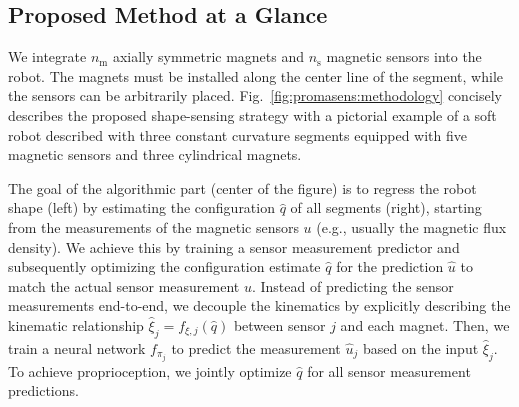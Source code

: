 \subsection{Proposed Method at a Glance}

We integrate $n_\mathrm{m}$ axially symmetric magnets and $n_\mathrm{s}$ magnetic sensors into the robot. The magnets must be installed along the center line of the segment, while the sensors can be arbitrarily placed.
%
%
Fig.~\ref{fig:promasens:methodology} concisely describes the proposed shape-sensing strategy with a pictorial example of a soft robot described with three constant curvature segments equipped with five magnetic sensors and three cylindrical magnets.
%

The goal of the algorithmic part (center of the figure) is to regress the robot shape (left) by estimating the configuration $\hat{q}$ of all segments (right),
starting from the measurements of the magnetic sensors $u$ (e.g., usually the magnetic flux density).
We achieve this by training a sensor measurement predictor and subsequently optimizing the configuration estimate $\hat{q}$ for the prediction $\hat{u}$ to match the actual sensor measurement $u$.
Instead of predicting the sensor measurements end-to-end, we decouple the kinematics by explicitly describing the kinematic relationship $\hat{\xi}_j = f_{\xi,j}(\hat{q})$ between sensor $j$ and each magnet. %
Then, we train a neural network $f_{\pi_j}$ to predict the measurement $\hat{u}_j$ based on the input $\hat{\xi}_j$.
To achieve proprioception, we jointly optimize $\hat{q}$ for all sensor measurement predictions. %


